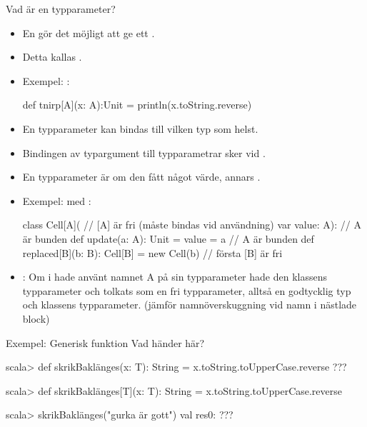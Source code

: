 \begin{Slide}{Vad är en typparameter?}\SlideFontSmall
  \setlength{\leftmargini}{0pt}

\begin{itemize}
\item En  gör det möjligt att ge ett .
\item Detta kallas  .
\item Exempel:  :
\begin{Code}
def tnirp[A](x: A):Unit = println(x.toString.reverse)
\end{Code}
\pause
\item En  typparameter kan bindas till vilken typ som helst.
\item Bindingen av typargument till typparametrar sker vid .
\item En typparameter är  om den  fått något värde, annars . 
\pause
\item Exempel:   med  :
\begin{Code}
class Cell[A](   // [A] är fri (måste bindas vid användning) 
    var value: A):                              // A är bunden
  def update(a: A): Unit = value = a            // A är bunden
  def replaced[B](b: B): Cell[B] = new Cell(b)  // första [B] är fri
\end{Code}
\pause
\item {}: Om  i  hade använt namnet A på sin typparameter hade den  klassens typparameter och tolkats som en  fri typparameter, alltså en godtycklig typ och  klassens typparameter. (jämför  namnöverskuggning vid  namn i nästlade block)
\end{itemize}

\end{Slide}

\ifkompendium\else
\begin{Slide}{Exempel: Generisk funktion}
Vad händer här?
\begin{REPL}

scala> def skrikBaklänges(x: T): String = x.toString.toUpperCase.reverse
???



scala> def skrikBaklänges[T](x: T): String = x.toString.toUpperCase.reverse

scala> skrikBaklänges("gurka är gott")
val res0: ???

\end{REPL}
\end{Slide}


